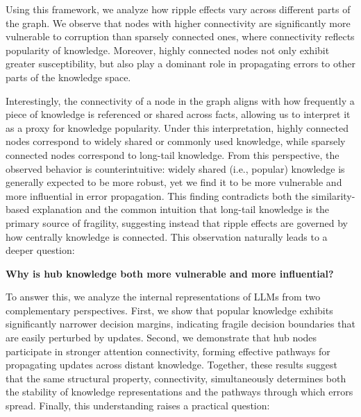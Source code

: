 Using this framework, we analyze how ripple effects vary across different parts of the graph. 
We observe that nodes with higher connectivity are significantly more vulnerable to corruption than sparsely connected ones, where connectivity reflects popularity of knowledge. 
Moreover, highly connected nodes not only exhibit greater susceptibility, but also play a dominant role in propagating errors to other parts of the knowledge space.

Interestingly, the connectivity of a node in the graph aligns with how frequently a piece of knowledge is referenced or shared across facts, allowing us to interpret it as a proxy for knowledge popularity. 
Under this interpretation, highly connected nodes correspond to widely shared or commonly used knowledge, while sparsely connected nodes correspond to long-tail knowledge.
From this perspective, the observed behavior is counterintuitive: widely shared (i.e., popular) knowledge is generally expected to be more robust,  yet we find it to be more vulnerable and more influential in error propagation. 
This finding contradicts both the similarity-based explanation and the common intuition that long-tail knowledge is the primary source of fragility, suggesting instead that ripple effects are governed by how centrally knowledge is connected. 
This observation naturally leads to a deeper question:

\textbf{Why is hub knowledge both more vulnerable and more influential?}


To answer this, we analyze the internal representations of LLMs from two complementary perspectives. First, we show that popular knowledge exhibits significantly narrower decision margins, indicating fragile decision boundaries that are easily perturbed by updates. Second, we demonstrate that hub nodes participate in stronger attention connectivity, forming effective pathways for propagating updates across distant knowledge. Together, these results suggest that the same structural property, connectivity, simultaneously determines both the stability of knowledge representations and the pathways through which errors spread.
Finally, this understanding raises a practical question:


